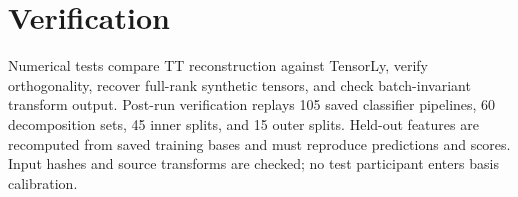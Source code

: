 \section{Verification}

Numerical tests compare TT reconstruction against TensorLy, verify orthogonality,
recover full-rank synthetic tensors, and check batch-invariant transform output.
Post-run verification replays 105 saved classifier pipelines, 60 decomposition
sets, 45 inner splits, and 15 outer splits. Held-out features are recomputed from
saved training bases and must reproduce predictions and scores. Input hashes and
source transforms are checked; no test participant enters basis calibration.

